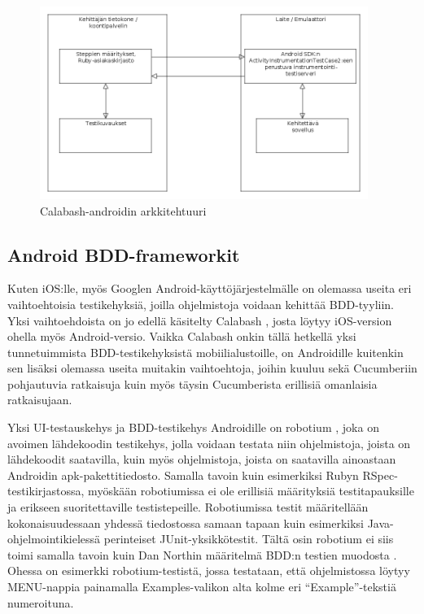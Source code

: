 \documentclass[finnish,nonumbib,nocopyright]{gradu2}
\begin{document}
\begin{figure}
\centering
\includegraphics[width=0.95\textwidth]{calabash}
\caption{Calabash-androidin arkkitehtuuri \cite{calabash}}
\end{figure}

\subsection{Android BDD-frameworkit}
Kuten iOS:lle, myös Googlen Android-käyttöjärjestelmälle on olemassa useita eri vaihtoehtoisia testikehyksiä, joilla ohjelmistoja voidaan kehittää BDD-tyyliin. Yksi vaihtoehdoista on jo edellä käsitelty Calabash \cite{calabash}, josta löytyy iOS-version ohella myös Android-versio. Vaikka Calabash onkin tällä hetkellä yksi tunnetuimmista BDD-testikehyksistä mobiilialustoille, on Androidille kuitenkin sen lisäksi olemassa useita muitakin vaihtoehtoja, joihin kuuluu sekä Cucumberiin pohjautuvia ratkaisuja kuin myös täysin Cucumberista erillisiä omanlaisia ratkaisujaan.

Yksi UI-testauskehys ja BDD-testikehys Androidille on robotium \cite{robotium}, joka on avoimen lähdekoodin testikehys, jolla voidaan testata niin ohjelmistoja, joista on lähdekoodit saatavilla, kuin myös ohjelmistoja, joista on saatavilla ainoastaan Androidin apk-pakettitiedosto. Samalla tavoin kuin esimerkiksi Rubyn RSpec-testikirjastossa, myöskään robotiumissa ei ole erillisiä määrityksiä testitapauksille ja erikseen suoritettaville testistepeille. Robotiumissa testit määritellään kokonaisuudessaan yhdessä tiedostossa samaan tapaan kuin esimerkiksi Java-ohjelmointikielessä perinteiset JUnit-yksikkötestit. Tältä osin robotium ei siis toimi samalla tavoin kuin Dan Northin määritelmä BDD:n testien muodosta \cite{bddintro}. Ohessa on esimerkki robotium-testistä, jossa testataan, että ohjelmistossa löytyy MENU-nappia painamalla Examples-valikon alta kolme eri ``Example''-tekstiä numeroituna.
\end{document}
